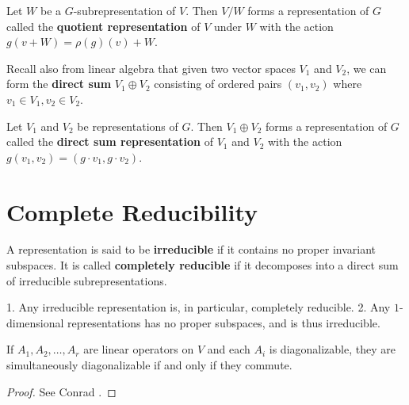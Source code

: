 \begin{defn}
Let $W$ be a $G$-subrepresentation of $V$.  Then $V/W$ forms a representation of $G$ called the \textbf{quotient representation} of $V$ under $W$ with the action $g( v + W) = \rho(g)(v) + W$.
\end{defn}

Recall also from linear algebra that given two vector spaces $V_1$ and $V_2$, we can form the \textbf{direct sum} $V_1 \oplus V_2$ consisting of ordered pairs $(v_1 ,v_2)$ where $v_1 \in V_1, v_2 \in V_2$.  

\begin{defn}
Let $V_1$ and $V_2$ be representations of $G$.  Then $V_1 \oplus V_2$ forms a representation of $G$ called the \textbf{direct sum representation} of $V_1$ and $V_2$ with the action $g (v_1, v_2) = (g \cdot  v_1, g \cdot v_2)$.
\end{defn}


\section{Complete Reducibility}
\begin{defn}
A representation is said to be \textbf{irreducible} if it contains no proper invariant subspaces.  It is called \textbf{completely reducible} if it decomposes into a direct sum of irreducible subrepresentations.
\end{defn}

\begin{example}

1. Any irreducible representation is, in particular, completely reducible.
2. Any $1$-dimensional representations has no proper subspaces, and is thus irreducible.
\end{example}

\begin{thm}\label{simultaneous} If $A_1, A_2, \ldots, A_r$ are linear operators on $V$ and each $A_i$ is diagonalizable, they are simultaneously diagonalizable if and only if they commute.
\end{thm}
\begin{proof}
 See Conrad \cite[Theorem 5.1] {ConradMinPoly}.
\end{proof}

